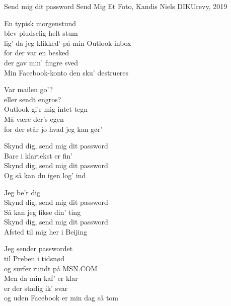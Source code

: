\begin{song}{Send mig dit password}
  {} %
  {Send Mig Et Foto, Kandis} %
  {Niels} %
  {DIKUrevy, 2019} %
  {\NotCCLIed} %

  \begin{SBVerse}
    En typisk morgenstund \\
    blev pludselig helt stum \\
    lig' da jeg klikked' på min Outlook-inbox \\
    for der var en besked \\
    der gav min' fingre sved \\
    Min Facebook-konto den sku' destrueres \\ \medskip
 
    Var mailen go'? \\
    eller sendt engros? \\
    Outlook gi'r mig intet tegn \\
    Må være der's egen \\
    for der står jo hvad jeg kan gør' \\
  \end{SBVerse}

\begin{SBChorus}
  Skynd dig, send mig dit password \\
  Bare i klartekst er fin' \\
  Skynd dig, send mig dit password \\
  Og så kan du igen log' ind \\ \medskip
  
  Jeg be'r dig \\
  Skynd dig, send mig dit password \\
  Så kan jeg fikse din' ting \\
  Skynd dig, send mig dit password \\
  Afsted til mig her i Beijing \\
\end{SBChorus}

\begin{SBVerse}
Jeg sender passwordet \\
til Preben i tidsnød \\
og surfer rundt på MSN.COM \\
Men da min kaf' er klar \\
er der stadig ik' svar \\
og uden Facebook er min dag så tom \\ \medskip


\end{SBVerse}
\end{song}
